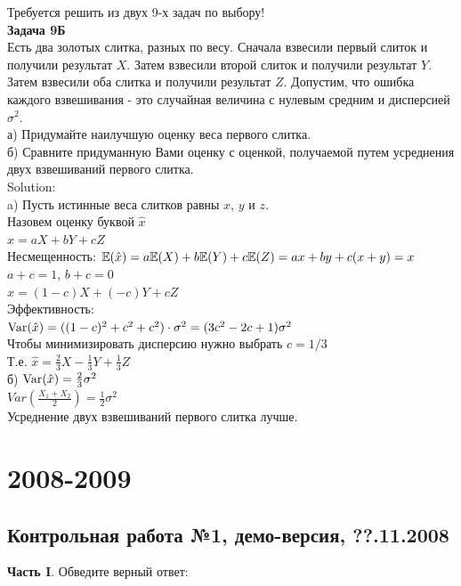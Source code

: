 \documentclass[12pt, a4paper]{article}\usepackage[]{graphicx}\usepackage[]{color}
\begin{document}
	Требуется решить \textbf{} из двух 9-х задач по
	выбору! \\

	\textbf{Задача 9Б} \\
	Есть два золотых слитка, разных по весу. Сначала взвесили первый слиток и получили результат $X$. Затем взвесили второй слиток и получили результат $Y$. Затем взвесили оба слитка и получили результат $Z$. Допустим, что ошибка каждого взвешивания - это случайная величина с нулевым средним и дисперсией $\sigma^{2}$. \\
	а) Придумайте наилучшую оценку веса первого слитка. \\
	б) Сравните придуманную Вами оценку с оценкой, получаемой путем усреднения двух взвешиваний первого слитка. \\
	Solution: \\
	a) Пусть истинные веса слитков равны $x$, $y$ и $z$. \\
	Назовем оценку буквой $\hat{x}$ \\
	$\hat{x}=aX+bY+cZ$ \\
	Несмещенность: $\mathbb{E}(\hat{x})=a\mathbb{E}(X)+b\mathbb{E}(Y)+c\mathbb{E}(Z)=ax+by+c(x+y)=x$ \\
	$a+c=1$, $b+c=0$ \\
	$\hat{x}=(1-c)X+(-c)Y+cZ$ \\
	Эффективность: \\
	$\operatorname{Var}(\hat{x})=((1-c)^{2}+c^{2}+c^{2})\cdot \sigma^{2}=(3c^{2}-2c+1)\sigma^{2}$ \\
	Чтобы минимизировать дисперсию нужно выбрать $c=1/3$ \\
	Т.е. $\hat{x}=\frac{2}{3}X-\frac{1}{3}Y+\frac{1}{3}Z$ \\
	б) $\operatorname{Var}(\hat{x})=\frac{2}{3}\sigma^{2}$ \\
	$Var\left(\frac{X_{1}+X_{2}}{2}\right)=\frac{1}{2}\sigma^{2}$ \\
	Усреднение двух взвешиваний первого слитка лучше. \\

	\section{2008-2009}

	\subsection{Контрольная работа №1, демо-версия, ??.11.2008}

	\textbf{Часть I}. Обведите верный ответ: \\
\end{document}
